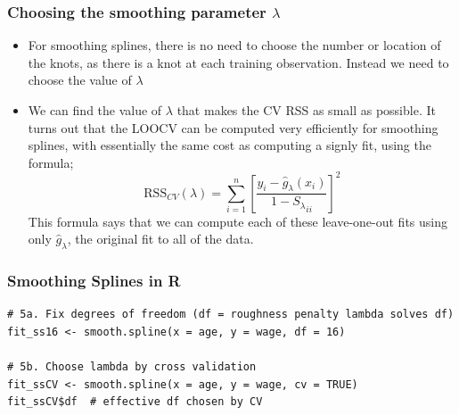 \documentclass{article}
\begin{document}
\subsubsection{Choosing the smoothing parameter $\lambda$}
\begin{itemize}
    \item For smoothing splines, there is no need to choose the number or location of the knots, as there is a knot at each training observation. Instead we need to choose the value of $\lambda$
    \item We can find the value of $\lambda$ that makes the CV RSS as small as possible. It turns out that the LOOCV can be computed very efficiently for smoothing splines, with essentially the same cost as computing a signly fit, using the formula;
    \begin{equation*}
        \mathrm{RSS}_{CV}(\lambda) = \sum_{i=1}^n [\frac{y_i - \hat{g}_\lambda(x_i)}{1 - {S_\lambda}_{ii}}]^2
    \end{equation*}
    This formula says that we can compute each of these leave-one-out fits using only $\hat{g}_\lambda$, the original fit to all of the data.
\end{itemize}

\subsubsection{ Smoothing Splines in R}
\begin{lstlisting}
# 5a. Fix degrees of freedom (df = roughness penalty lambda solves df)
fit_ss16 <- smooth.spline(x = age, y = wage, df = 16)

# 5b. Choose lambda by cross validation
fit_ssCV <- smooth.spline(x = age, y = wage, cv = TRUE)
fit_ssCV$df  # effective df chosen by CV
\end{lstlisting}
\end{document}

